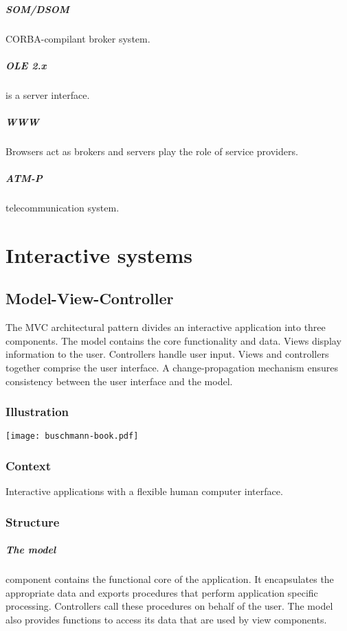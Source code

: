 \documentclass[a4paper,11pt,twocolumn]{report}
\begin{document}
    \paragraph{SOM/DSOM} CORBA-compilant broker system.
    \paragraph{OLE 2.x} is a server interface.
    \paragraph{WWW} Browsers act as brokers and servers play the role of
    service providers.
    \paragraph{ATM-P} telecommunication system.


    
    \chapter{Interactive systems}
    
    \section{Model-View-Controller}
    The MVC architectural pattern divides an interactive application into three
    components. The model contains the core functionality and data. Views
    display information to the user. Controllers handle user input. Views and
    controllers together comprise the user interface. A change-propagation
    mechanism ensures consistency between the user interface and the model.
    \subsection{Illustration}
    \texttt{[image: buschmann-book.pdf]}
    \subsection{Context}
    Interactive applications with a flexible human computer interface.
    \subsection{Structure}
    \paragraph{The model} component contains the functional core of the
    application. It encapsulates the appropriate data and exports procedures
    that perform application specific processing. Controllers call these
    procedures on behalf of the user. The model also provides functions to
    access its data that are used by view components.
\end{document}
